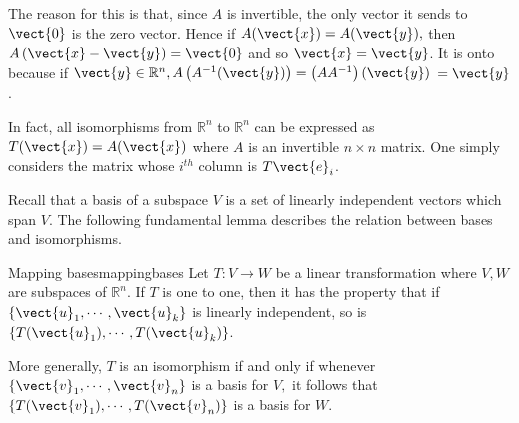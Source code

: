 \begin{solution}
The reason for this is that, since $A$ is invertible, the only vector it
sends to $\vect{0}$ is the zero vector. Hence if $A(\vect{x})=A(\vect{y}),$ then $A\left( \vect{x}-\vect{y}\right) =\vect{0}$ and so $\vect{x}=\vect{y}$. It is onto
because if $\vect{y}\in \mathbb{R}^{n},A\left( A^{-1} (\vect{y})\right) =\left(
AA^{-1}\right) (\vect{y})$ $=\vect{y}$. 
\end{solution}

In fact, all isomorphisms from $\mathbb{R}^{n}$ to $\mathbb{R}^{n}$ can be expressed as $T(\vect{x}) = A(\vect{x})$ where $A$ is an invertible $n \times n$ matrix. One
simply considers the matrix whose $i^{th}$ column is $T\vect{e}_{i}$.

Recall that a basis of a subspace $V$ is a set of linearly independent vectors which span $V$. The following fundamental lemma describes the relation between bases and
isomorphisms.

\begin{lemma}{Mapping bases}{mappingbases}
Let $T:V\rightarrow W$ be a linear transformation where $V,W$ are
subspaces of $\mathbb{R}^n$. If $T$ is one to one, then it has the property that if $\left\{ \vect{u}_{1},\cdots ,\vect{u}_{k}\right\} $ is linearly independent, so is $\left\{ T(\vect{u}_{1}),\cdots ,T(\vect{u}_{k})\right\} $.

More generally, $T$ is an isomorphism if and only if whenever $\left\{ 
\vect{v}_{1},\cdots ,\vect{v}_{n}\right\} $ is a basis for $V,$ it follows that $\left\{ T
(\vect{v}_{1}),\cdots ,T(\vect{v}_{n})\right\} $ is a basis for $W$. 
\end{lemma}

